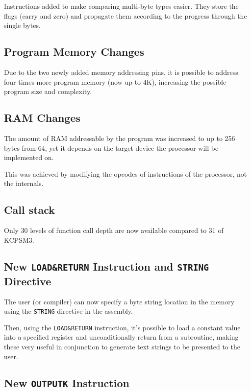         Instructions added to make comparing multi-byte types easier. They store the flags (carry and zero) and propagate them according to the progress through the single bytes.

        \subsection{Program Memory Changes}

        Due to the two newly added memory addressing pins, it is possible to address four times more program memory (now up to 4K), increasing the possible program size and complexity.

        \subsection{RAM Changes}

        The amount of RAM addressable by the program was increased to up to 256 bytes from 64, yet it depends on the target device the processor will be implemented on. 

        This was achieved by modifying the opcodes of instructions of the processor, not the internals.

        \subsection{Call stack}

        Only 30 levels of function call depth are now available compared to 31 of KCPSM3.

        \subsection{New \texttt{LOAD\&RETURN} Instruction and \texttt{STRING} Directive}

        The user (or compiler) can now specify a byte string location in the memory using the \texttt{STRING} directive in the assembly.

        Then, using the \texttt{LOAD\&RETURN} instruction, it's possible to load a constant value into a specified register and unconditionally return from a subroutine, making these very useful in conjunction to generate text strings to be presented to the user.

        \subsection{New \texttt{OUTPUTK} Instruction}

